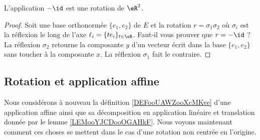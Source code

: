 \begin{lemma}       \label{LEMooMIJXooCjiQqP}
    L'application \( -\id\) est une rotation de \( \eR^2\).
\end{lemma}

\begin{proof}
    Soit une base orthonormée \( \{ e_1,e_2 \}\) de \( E\) et la rotation \( r=\sigma_1\sigma_2\) où \( \sigma_i\) est la réflexion le long de l'axe \( \ell_i=\{ te_i \}_{t\in \eR}\). Faut-il vous prouver que \( r=-\id\) ? La réflexion \( \sigma_2\) retourne la composante \( y\) d'un vecteur écrit dans la base \( \{ e_1,e_2 \}\) sans toucher à la composante \( x\). La réflexion \( \sigma_1\) fait le contraire.
\end{proof}

\subsection{Rotation et application affine}

Nous considérons à nouveau la définition \ref{DEFooUAWZooXcMKve} d'une application affine ainsi que sa décomposition en application linéaire et translation donnée par le lemme \ref{LEMooYJCDooOGAHkF}. Nous voyons maintenant comment ces choses se mettent dans le cas d'une rotation non centrée en l'origine.

